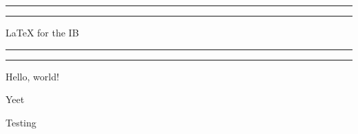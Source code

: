 \documentclass[12pt]{article}
\begin{document}
\begin{titlepage}
\centering
\scshape
\vfill

\rule{\textwidth}{1.6pt}\vspace*{-\baselineskip}\vspace*{2pt} %
\rule{\textwidth}{0.4pt} %

\vspace{0.75\baselineskip} %
\LARGE{LaTeX for the IB}
\vspace{0.75\baselineskip} %

\rule{\textwidth}{0.4pt}\vspace*{-\baselineskip}\vspace{3.2pt} %
\rule{\textwidth}{1.6pt} %

\vfill
\end{titlepage}

Hello, world!

Yeet

Testing
\end{document}
